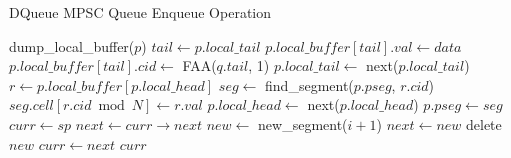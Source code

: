 \begin{algorithm}[!ht]
    \centering
    \captionsetup{justification=centering}
    \caption{DQueue \ac{MPSC} Queue Enqueue Operation \cite{WangCacheCoherent}}
    \label{alg:dqueue-enqueue}
    \scriptsize
    \begin{algorithmic}[1]
                \State dump\_local\_buffer($p$) 
            \EndIf
            \State $tail \gets p.local\_tail$
            \State $p.local\_buffer[tail].val \gets data$
            \State $p.local\_buffer[tail].cid \gets$ FAA($q.tail$, 1) 
            \State $p.local\_tail \gets$ next($p.local\_tail$)
        \EndFunction
        \State
                \State $r \gets p.local\_buffer[p.local\_head]$
                \State $seg \gets$ find\_segment($p.pseg$, $r.cid$)
                \State $seg.cell[r.cid \bmod N] \gets r.val$ 
                \State $p.local\_head \gets$ next($p.local\_head$)
                    \State $p.pseg \gets seg$ 
                \EndIf
            \EndWhile
        \EndFunction
        \State
            \State $curr \gets sp$
                \State $next \gets curr\rightarrow next$
                    \State $new \gets$ new\_segment($i + 1$)
                        \State $next \gets new$
                    \Else
                        \State delete $new$ 
                    \EndIf
                \EndIf
                \State $curr \gets next$
            \EndFor
            \State \Return $curr$
        \EndFunction
    \end{algorithmic}
\end{algorithm}

